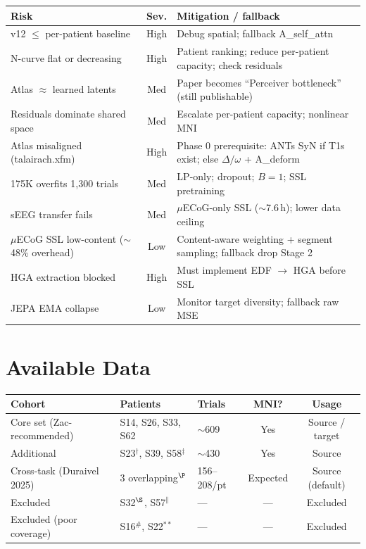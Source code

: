 \documentclass[11pt,letterpaper]{article}
\begin{document}
\begin{table}[ht!]\centering\small
\begin{tabular}{@{}p{}cp{}@{}}
\toprule
\textbf{Risk} & \textbf{Sev.} & \textbf{Mitigation / fallback} \\
\midrule
v12 $\leq$ per-patient baseline & High & Debug spatial; fallback A\_self\_attn \\
N-curve flat or decreasing & High & Patient ranking; reduce per-patient capacity; check residuals \\
Atlas $\approx$ learned latents & Med & Paper becomes ``Perceiver bottleneck'' (still publishable) \\
Residuals dominate shared space & Med & Escalate per-patient capacity; nonlinear MNI \\
Atlas misaligned (talairach.xfm) & High & \textcolor{BrickRed}{Phase 0 prerequisite:} ANTs SyN if T1s exist; else $\Delta/\omega$ + A\_deform \\
175K overfits 1{,}300 trials & Med & LP-only; dropout; $B{=}1$; SSL pretraining \\
sEEG transfer fails & Med & $\mu$ECoG-only SSL (${\sim}$7.6\,h); lower data ceiling \\
$\mu$ECoG SSL low-content (${\sim}$48\% overhead) & Low & Content-aware weighting + segment sampling; fallback drop Stage 2 \\
HGA extraction blocked & High & \textcolor{BrickRed}{Must implement EDF $\to$ HGA} before SSL \\
JEPA EMA collapse & Low & Monitor target diversity; fallback raw MSE \\
\bottomrule
\end{tabular}
\end{table}



\section{Available Data}\label{sec:data}

\begin{table}[ht!]\centering\small
\begin{tabular}{@{}lllcc@{}}
\toprule
\textbf{Cohort} & \textbf{Patients} & \textbf{Trials} & \textbf{MNI?} & \textbf{Usage} \\
\midrule
Core set (Zac-recommended) & S14, S26, S33, S62 & ${\sim}$609 & Yes & Source / target \\
Additional & S23$^\dagger$, S39, S58$^\ddagger$ & ${\sim}$430 & Yes & Source \\
Cross-task (Duraivel 2025) & 3 overlapping$^\P$ & 156--208/pt & Expected & Source (default) \\
Excluded & S32$^\S$, S57$^\|$ & --- & --- & Excluded \\
Excluded (poor coverage) & S16$^\#$, S22$^{**}$ & --- & --- & Excluded \\
\bottomrule
\end{tabular}
\end{table}
\end{document}
